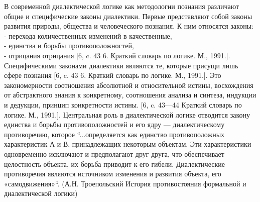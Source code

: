 \documentclass[a4paper,12pt]{report}
\begin{document}
	В современной диалектической логике как методологии познания различают общие и специфические законы диалектики. Первые представляют собой законы развития природы, общества и человеческого познания. К ним относятся законы:\\
	- перехода количественных изменений в качественные, \\
	- единства и борьбы противоположностей,\\
	-  отрицания отрицания [6, c. 43 6. Краткий словарь по логике. М., 1991.].\\
	 Специфическими законами диалектики являются те, которые присущи лишь сфере познания [6, c. 43 6. Краткий словарь по логике. М., 1991.]. Это закономерности соотношения абсолютной и относительной истины, восхождения от абстрактного знания к конкретному, соотношения анализа и синтеза, индукции и дедукции, принцип конкретности истины. [6, c. 43—44  Краткий словарь по логике. М., 1991.]. Центральная роль  в диалектической логике отводится закону единства и борьбы противоположностей и его ядру — диалектическому противоречию, которое   “...определяется как единство противоположных характеристик А и В, принадлежащих некоторым объектам. Эти характеристики одновременно исключают и предполагают друг друга, что обеспечивает целостность объекта, их борьба приводит к его гибели. Диалектические противоречия являются источником изменения и развития объекта, его «самодвижения»“. (А.Н. Троепольский История противостояния формальной и диалектической логики) \\
\end{document}
